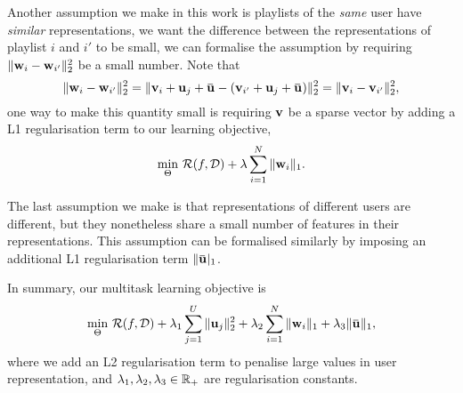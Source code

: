 Another assumption we make in this work is playlists of the \emph{same} user have \emph{similar} representations,
\ie we want the difference between the representations of playlist $i$ and $i'$ to be small,
we can formalise the assumption by requiring $\|\mathbf{w}_i - \mathbf{w}_{i'}\|_2^2$ be a small number. 
Note that
$$
\|\w_i - \w_{i'}\|_2^2 = \|\bv_i + \bu_j + \widebar\bu - (\bv_{i'} + \bu_j + \widebar\bu) \|_2^2 = \|\bv_i - \bv_{i'}\|_2^2,
$$
one way to make this quantity small is requiring $\mathbf{v}$ be a sparse vector by adding a L1 regularisation term 
to our learning objective, \ie
$$
\min_{\Theta} \, \mathcal{R}(f, \mathcal{D}) + \lambda \sum_{i=1}^N \|\mathbf{w}_i\|_1.
$$

The last assumption we make is that representations of different users are different, 
but they nonetheless share a small number of features in their representations.
This assumption can be formalised similarly by imposing an additional L1 regularisation term $\|\widebar\bu|_1$.

In summary, our multitask learning objective is
\begin{equation}
\label{eq:obj}
\min_{\Theta} \, \RCal(f, \DCal) 
   + \lambda_1 \sum_{j=1}^U \|\bu_j\|_2^2 + \lambda_2 \sum_{i=1}^N \|\w_i\|_1 + \lambda_3 \|\widebar\bu\|_1,
\end{equation}
where we add an L2 regularisation term to penalise large values in user representation,
and $\lambda_1, \lambda_2, \lambda_3 \in \mathbb{R}_+$ are regularisation constants.
